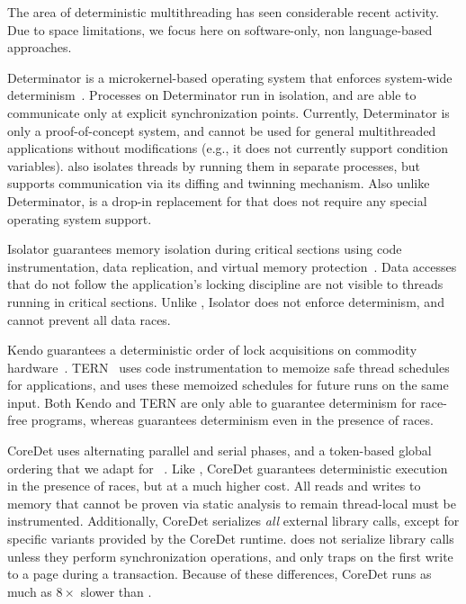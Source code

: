 \label{sec:related-work}

The area of deterministic multithreading has seen considerable recent
activity. Due to space limitations, we focus here on software-only,
non language-based approaches.

Determinator is a microkernel-based operating system that enforces
system-wide determinism~\cite{efficient-system-enforced}.  Processes
on Determinator run in isolation, and are able to communicate only at
explicit synchronization points.  Currently, Determinator is only a
proof-of-concept system, and cannot be used for general multithreaded
applications without modifications (e.g., it does not currently
support condition variables).  \dthreads{} also isolates threads by
running them in separate processes, but supports communication via its
diffing and twinning mechanism. Also unlike Determinator, \dthreads{}
is a drop-in replacement for \pthreads{} that does not require any
special operating system support.


Isolator guarantees memory isolation during critical sections using
code instrumentation, data replication, and virtual memory
protection~\cite{1508266}.  Data accesses that do not follow the
application's locking discipline are not visible to threads running in
critical sections. Unlike \dthreads{}, Isolator does not enforce
determinism, and cannot prevent all data races.

Kendo guarantees a deterministic order of lock acquisitions on
commodity hardware~\cite{1508256}. TERN~\cite{stable-deterministic}
uses code instrumentation to memoize safe thread schedules for
applications, and uses these memoized schedules for future runs on the
same input.  Both Kendo and TERN are only able to guarantee
determinism for race-free programs, whereas \dthreads{} guarantees
determinism even in the presence of races.

CoreDet uses alternating parallel and serial phases, and a token-based
global ordering that we adapt
for \dthreads{}~\cite{Bergan:2010:CCR:1736020.1736029}.
Like \dthreads{}, CoreDet guarantees deterministic execution in the
presence of races, but at a much higher cost.  All reads and writes to
memory that cannot be proven via static analysis to remain
thread-local must be instrumented.  Additionally, CoreDet 
serializes \emph{all} external library calls, except for specific
variants provided by the CoreDet runtime.  \dthreads{} does not
serialize library calls unless they perform synchronization
operations, and only traps on the first write to a page during a
transaction.  Because of these differences, CoreDet runs as much as $8\times$
slower than \dthreads{}.

